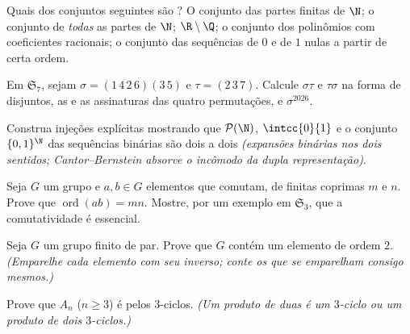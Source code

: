 \begin{exercise}[$\star$]\label{exo:b2:structures:1}
Quais dos conjuntos seguintes são ? O conjunto das partes finitas
de $\N$; o conjunto de \emph{todas} as partes de $\N$; $\R \setminus \Q$;
o conjunto dos polinômios com coeficientes racionais; o conjunto das
sequências de $0$ e de $1$ nulas a partir de certa ordem.
\end{exercise}

\begin{exercise}[$\star$]\label{exo:b2:structures:2}
Em $\mathfrak{S}_7$, sejam $\sigma = (1\,4\,2\,6)(3\,5)$ e $\tau =
(2\,3\,7)$. Calcule $\sigma\tau$ e $\tau\sigma$ na forma de  disjuntos,
as  e as assinaturas das quatro permutações, e
$\sigma^{2026}$.
\end{exercise}

\begin{exercise}[$\star$]\label{exo:b2:structures:3}
Construa injeções explícitas mostrando que $\mathcal{P}(\N)$,
$\intcc{0}{1}$ e o conjunto $\{0,1\}^{\N}$ das sequências binárias são
dois a dois  \emph{(expansões binárias nos dois sentidos;
Cantor--Bernstein absorve o incômodo da dupla representação)}.
\end{exercise}

\begin{exercise}[$\star$]\label{exo:b2:structures:4}
Seja $G$ um grupo e $a, b \in G$ elementos que comutam, de  finitas
coprimas $m$ e $n$. Prove que $\operatorname{ord}(ab) =
mn$. Mostre, por um exemplo em $\mathfrak{S}_3$, que a comutatividade é
essencial.
\end{exercise}

\begin{exercise}[$\star\star$]\label{exo:b2:structures:5}
Seja $G$ um grupo finito de  par. Prove que $G$ contém um
elemento de ordem $2$. \emph{(Emparelhe cada elemento com seu inverso;
conte os que se emparelham consigo mesmos.)}
\end{exercise}

\begin{exercise}[$\star\star$]\label{exo:b2:structures:6}
Prove que $A_n$ ($n \geq 3$) é  pelos $3$-ciclos.
\emph{(Um produto de duas  é um $3$-ciclo ou um produto
de dois $3$-ciclos.)}
\end{exercise}


